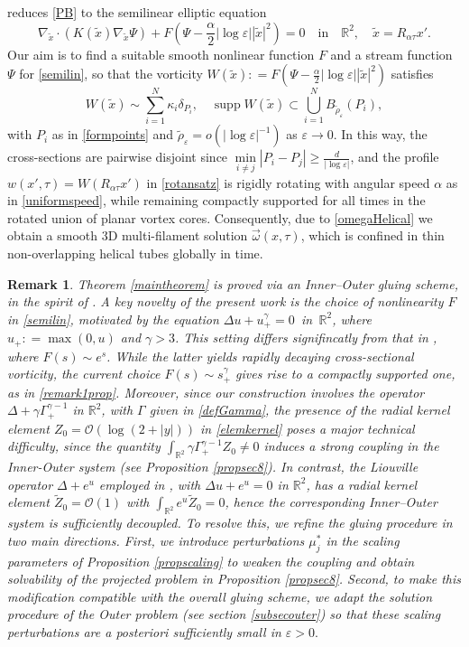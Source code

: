 \documentclass[11pt,reqno,a4paper]{amsart}
\numberwithin{equation}{section}
\newcommand{\R}{\mathbb{R}}
\newcommand{\defeq}{\mathrel{\mathop:}=}
\newcommand{\ve}{\varepsilon}
\newtheorem{remark}{Remark}[section]
\begin{document}
reduces \eqref{PB} to the semilinear elliptic equation
\begin{equation}\label{semilin}
\nabla_{\tilde{x}}\cdot\left(K(\tilde x)\nabla_{\tilde{x}}\Psi\right)+F\left(\Psi-\frac{\alpha}{2}|\log\ve||\tilde{x}|^2\right)=0 \quad \mbox{in} \quad \R^2, \quad \tilde{x}=R_{\alpha\tau}x'.
\end{equation}
Our aim is to find a suitable smooth nonlinear function $F$ and a stream function $\Psi$ for \eqref{semilin}, so that the 
vorticity $W(\tilde x)\defeq F\left(\Psi-\frac{\alpha}
{2}|\log\ve||\tilde x|^2\right)$
satisfies
\[W(\tilde x)\sim \sum_{i=1}^{N}\kappa_i\delta_{P_i},\quad \operatorname{supp}W(\tilde x) \subset \bigcup_{i=1}^{N} B_{\tilde{\rho}_{\ve}}(P_i) , \]
with $P_i$ as in \eqref{formpoints} and $\tilde{\rho}_{\ve}=o\left(|\log\ve|^{-1}\right)$ as $\ve\to 0$. In this way, the cross-sections are pairwise disjoint since $\min\limits_{i\neq j}|P_i-P_j|\geq\frac{d}{|\log\ve|}$, and the profile  $w(x',\tau)=W(R_{\alpha\tau} x')$ in \eqref{rotansatz}  
is rigidly rotating with angular speed $\alpha$ as in \eqref{uniformspeed}, while remaining compactly supported for all times in the rotated union of planar vortex cores. Consequently, due to \eqref{omegaHelical} we obtain a smooth $3$D multi-filament solution $\vec{\omega}(x,\tau)$, which is confined in thin non-overlapping helical tubes globally in time.
\begin{remark}\label{decoupling}
Theorem \ref{maintheorem} is proved via an Inner–Outer gluing scheme, in the spirit of \cite{MR4899797}. A key novelty of the present work is the choice of nonlinearity $F$ in \eqref{semilin}, motivated by the equation $\Delta u + u^{\gamma}_{+}=0 \,$ in $\,\R^2$, where $u_{+}\defeq\max(0,u)$ and $\gamma>3$. This setting differs signifincatly from that in \cite{MR4899797}, where $F(s)\sim e^{s}$. While the latter yields rapidly decaying cross-sectional vorticity, the current choice $F(s)\sim s_{+}^{\gamma}$ gives rise to a compactly supported one, as in \eqref{remark1prop}. Moreover, since our construction involves the operator  $\Delta+\gamma\Gamma_{+}^{\gamma-1}$ in $\R^2$, with $\Gamma$ given in \eqref{defGamma}, the presence of the radial kernel element $Z_{0}=\mathcal{O}(\log(2+|y|))$ in \eqref{elemkernel} poses a major technical difficulty, since the quantity $
\int_{\R^{2}} \gamma \Gamma_{+}^{\gamma-1} Z_{0} \neq 0$ induces a strong coupling in the Inner-Outer system (see Proposition \ref{propsec8}). In contrast, the Liouville operator $\Delta+e^{u}$ employed in \cite{MR4899797}, with $\Delta u + e^{u}=0$ in $\R^2$, has a radial kernel element $\widetilde {Z}_{0}=\mathcal{O}(1)$ with $\int_{\R^{2}} e^{u}\widetilde {Z}_{0}=0$, hence the corresponding Inner–Outer system is sufficiently decoupled. To resolve this, we refine the gluing procedure in two main directions. First, we introduce perturbations $\mu_j^{*}$ in the scaling parameters of Proposition \ref{propscaling} to weaken the coupling and obtain solvability of the projected problem in Proposition \ref{propsec8}. Second, to make this modification compatible with the overall gluing scheme, we adapt the solution procedure of the Outer problem (see section \ref{subsecouter}) so that these scaling perturbations are a posteriori sufficiently small in $\ve>0.$
\end{remark}
\end{document}
